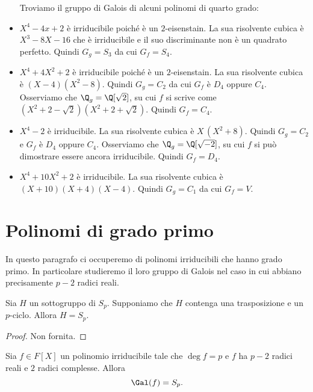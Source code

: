 \begin{ese}
	\begin{itemize}
		Troviamo il gruppo di Galois di alcuni polinomi di quarto grado:
		\item \(X^4-4x+2\) è irriducibile poiché è un \(2\)-eisenstain. La sua risolvente cubica è \(X^3-8X-16\) che è irriducibile e il suo discriminante non è un quadrato perfetto. Quindi \(G_g= S_3\) da cui \(G_f = S_4\).
		\item \(X^4+4X^2+2\) è irriducibile poiché è un \(2\)-eisenstain. La sua risolvente cubica è \((X-4)(X^2-8)\). Quindi \(G_g = C_2\) da cui \(G_f\) è \(D_4\) oppure \(C_4\). Osserviamo che \(\Q_g = \Q[\sqrt{2}]\), su cui \(f\) si scrive come \((X^2+2-\sqrt{2})(X^2+2+\sqrt{2})\). Quindi \(G_f=C_4\).
		\item \(X^4-2\) è irriducibile. La sua risolvente cubica è \(X\,(X^2+8)\). Quindi \(G_g=C_2\) e \(G_f\) è \(D_4\) oppure \(C_4\). Osserviamo che \(\Q_g = \Q[\sqrt{-2}]\), su cui \(f\) si può dimostrare essere ancora irriducibile. Quindi \(G_f = D_4\).
		\item \(X^4+10X^2+2\) è irriducibile. La sua risolvente cubica è \((X+10)(X+4)(X-4)\).
		      Quindi \(G_g = C_1\) da cui \(G_f = V\).
	\end{itemize}
\end{ese}
\section{Polinomi di grado primo}

In questo paragrafo ci occuperemo di polinomi irriducibili che hanno grado primo. In particolare studieremo il loro gruppo di Galois nel caso in cui abbiano precisamente \(p-2\) radici reali.

\begin{lem}
	Sia \(H\) un sottogruppo di \(S_p\). Supponiamo che \(H\) contenga una trasposizione e un \(p\)-ciclo.
	Allora \(H=S_p\).
\end{lem}

\begin{proof}
	Non fornita.
\end{proof}

\begin{prop}{}{}
	Sia \(f\in F[X]\) un polinomio irriducibile tale che \(\deg f = p\) e \(f\) ha \(p-2\) radici reali e \(2\) radici complesse. Allora
	\[
		\Gal(f) = S_p.
	\]
\end{prop}

